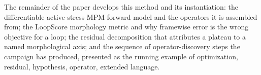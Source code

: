 \documentclass[11pt]{article}
\begin{document}
The remainder of the paper develops this method and its instantiation: the differentiable active-stress MPM forward model and the operators it is assembled from; the LoopScore morphology metric and why framewise error is the wrong objective for a loop; the residual decomposition that attributes a plateau to a named morphological axis; and the sequence of operator-discovery steps the campaign has produced, presented as the running example of optimization, residual, hypothesis, operator, extended language.
\end{document}
